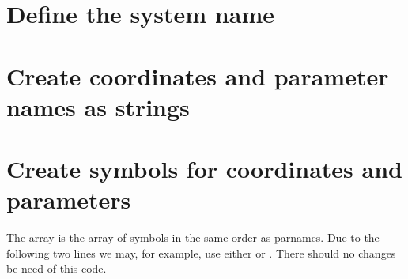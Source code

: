 \documentclass[letterpaper,10pt,english]{jupyterBook}
\begin{document}
\section{Define the system name}
\label{\detokenize{BazykinGenSym:define-the-system-name}}
\begin{sphinxVerbatim}[commandchars=\\\{\}]
\end{sphinxVerbatim}


\section{Create coordinates and parameter names as strings}
\label{\detokenize{BazykinGenSym:create-coordinates-and-parameter-names-as-strings}}
\begin{sphinxVerbatim}[commandchars=\\\{\}]
\end{sphinxVerbatim}


\section{Create symbols for coordinates and parameters}
\label{\detokenize{BazykinGenSym:create-symbols-for-coordinates-and-parameters}}
\sphinxAtStartPar
The array  is the array of symbols in the same order as parnames.
Due to the following two lines we may, for example, use either  or
. There should no changes be need of this code.

\begin{sphinxVerbatim}[commandchars=\\\{\}]
\end{sphinxVerbatim}
\end{document}
